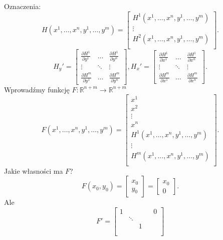 \documentclass[../main.tex]{subfiles}
\begin{document}
\begin{dowod}
    Oznaczenia:
    \[
        H(x^1,\ldots,x^n,y^1,\ldots,y^m) = \begin{bmatrix}
        H^1(x^1,\ldots,x^n,y^1,\ldots,y^m)\\
        \vdots\\
        H^2(x^1,\ldots,x^n,y^1,\ldots,y^m)\\
    \end{bmatrix}
    .\]
    \[
    H_y' = \begin{bmatrix}
    \frac{\partial H^1}{\partial y^1} &\ldots&\frac{\partial H^1}{\partial y^n} \\
    \vdots&\ddots&\vdots\\
\frac{\partial H^m}{\partial y^1} &\ldots&\frac{\partial H^m}{\partial y^n} \end{bmatrix},
    H_x' = \begin{bmatrix}
    \frac{\partial H^1}{\partial x^1} &\ldots&\frac{\partial H^1}{\partial x^n} \\
    \vdots&\ddots&\vdots\\
\frac{\partial H^m}{\partial x^1} &\ldots&\frac{\partial H^m}{\partial x^n} \end{bmatrix}
    .\]
    Wprowadźmy funkcję $F:\mathbb{R}^{n+m}\to\mathbb{R}^{n+m}$
    \[
        F(x^1,\ldots,x^n,y^1,\ldots,y^m) = \begin{bmatrix}
        x^1\\
    x^2\\
\vdots\\
x^n\\
H^1(x^1,\ldots,x^n,y^1,\ldots,y^m)\\
\vdots\\
H^m(x^1,\ldots,x^n,y^1,\ldots,y^m)\\
\end{bmatrix}
    .\]
    Jakie własności ma $F$?
    \[
        F(x_0,y_0) = \begin{bmatrix}
        x_0\\
        y_0\end{bmatrix} = \begin{bmatrix}
        x_0\\
        0\end{bmatrix}
    .\]
    Ale \[
    F' = \begin{bmatrix}
        1&&&&0\\
         &\ddots&&&\\
         &&1&&\\
         &&&&\\

\end{bmatrix}\]
\end{dowod}
\end{document}
